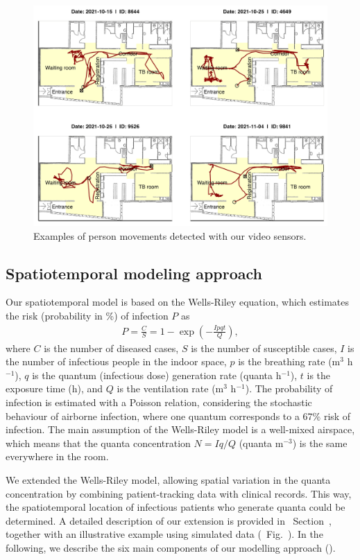 \documentclass[fleqn,11pt]{wlscirep}
\begin{document}
\begin{figure}[!htpb]
    \centering
    \includegraphics{results/data/example-patient-tracks.png}
    \caption{Examples of person movements detected with our video sensors.}
    \label{fig:tracking-examples}
\end{figure}


\subsection*{Spatiotemporal modeling approach}

Our spatiotemporal model is based on the Wells-Riley equation\cite{Riley1961Book}, which estimates the risk (probability in \%) of infection $P$ as
\begin{align}
    P = \frac{C}{S} = 1 - \exp\left(-\frac{Ipqt}{Q}\right),
\end{align}
where $C$ is the number of diseased cases, $S$ is the number of susceptible cases, $I$ is the number of infectious people in the indoor space, $p$ is the breathing rate (m$^3$ h$^{-1}$), $q$ is the quantum (infectious dose) generation rate (quanta h$^{-1}$), $t$ is the exposure time (h), and $Q$ is the ventilation rate (m$^3$ h$^{-1}$). The probability of infection is estimated with a Poisson relation, considering the stochastic behaviour of airborne infection, where one quantum corresponds to a 67\% risk of infection. The main assumption of the Wells-Riley model is a well-mixed airspace, which means that the quanta concentration $N = Iq/Q$ (quanta m$^{-3}$) is the same everywhere in the room. 

We extended the Wells-Riley model, allowing spatial variation in the quanta concentration by combining patient-tracking data with clinical records. This way, the spatiotemporal location of infectious patients who generate quanta could be determined. A detailed description of our extension is provided in \supp~Section~, together with an illustrative example using simulated data (\supp~Fig.~). In the following, we describe the six main components of our modelling approach ().
\end{document}
